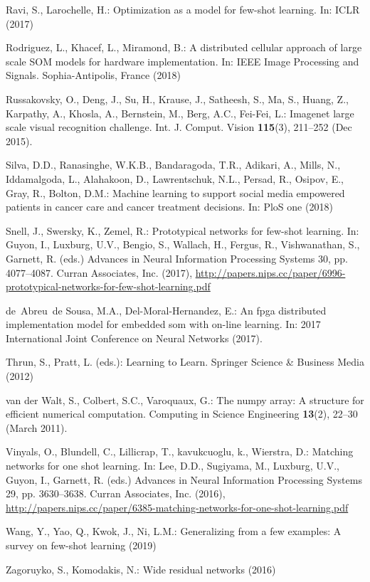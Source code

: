 \documentclass[runningheads]{llncs}
\begin{document}
\begin{thebibliography}{10}
Ravi, S., Larochelle, H.: Optimization as a model for few-shot learning. In:
  ICLR (2017)

Rodriguez, L., Khacef, L., Miramond, B.: {A distributed cellular approach of
  large scale SOM models for hardware implementation}. In: {IEEE Image
  Processing and Signals}. Sophia-Antipolis, France (2018)

Russakovsky, O., Deng, J., Su, H., Krause, J., Satheesh, S., Ma, S., Huang, Z.,
  Karpathy, A., Khosla, A., Bernstein, M., Berg, A.C., Fei-Fei, L.: Imagenet
  large scale visual recognition challenge. Int. J. Comput. Vision
  \textbf{115}(3),  211–252 (Dec 2015). 

Silva, D.D., Ranasinghe, W.K.B., Bandaragoda, T.R., Adikari, A., Mills, N.,
  Iddamalgoda, L., Alahakoon, D., Lawrentschuk, N.L., Persad, R., Osipov, E.,
  Gray, R., Bolton, D.M.: Machine learning to support social media empowered
  patients in cancer care and cancer treatment decisions. In: PloS one (2018)

Snell, J., Swersky, K., Zemel, R.: Prototypical networks for few-shot learning.
  In: Guyon, I., Luxburg, U.V., Bengio, S., Wallach, H., Fergus, R.,
  Vishwanathan, S., Garnett, R. (eds.) Advances in Neural Information
  Processing Systems 30, pp. 4077--4087. Curran Associates, Inc. (2017),
  \url{http://papers.nips.cc/paper/6996-prototypical-networks-for-few-shot-learning.pdf}

de~Abreu~de Sousa, M.A., Del-Moral-Hernandez, E.: An fpga distributed
  implementation model for embedded som with on-line learning. In: 2017
  International Joint Conference on Neural Networks (2017).

Thrun, S., Pratt, L. (eds.): Learning to Learn. Springer Science \& Business
  Media (2012)

{van der Walt}, S., {Colbert}, S.C., {Varoquaux}, G.: The numpy array: A
  structure for efficient numerical computation. Computing in Science
  Engineering  \textbf{13}(2),  22--30 (March 2011). 

Vinyals, O., Blundell, C., Lillicrap, T., kavukcuoglu, k., Wierstra, D.:
  Matching networks for one shot learning. In: Lee, D.D., Sugiyama, M.,
  Luxburg, U.V., Guyon, I., Garnett, R. (eds.) Advances in Neural Information
  Processing Systems 29, pp. 3630--3638. Curran Associates, Inc. (2016),
  \url{http://papers.nips.cc/paper/6385-matching-networks-for-one-shot-learning.pdf}

Wang, Y., Yao, Q., Kwok, J., Ni, L.M.: Generalizing from a few examples: A
  survey on few-shot learning (2019)

Zagoruyko, S., Komodakis, N.: Wide residual networks (2016)

\end{thebibliography}
\end{document}
